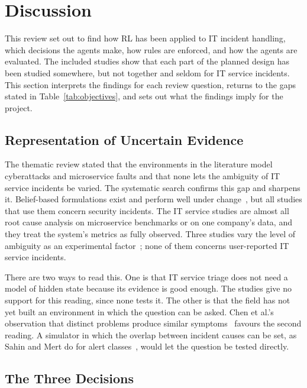 \section{Discussion}
\label{sec:discussion}

This review set out to find how RL has been applied to IT incident handling, which decisions the agents make, how rules are enforced, and how the agents are evaluated. The \NIncluded{} included studies show that each part of the planned design has been studied somewhere, but not together and seldom for IT service incidents. This section interprets the findings for each review question, returns to the gaps stated in Table~\ref{tab:objectives}, and sets out what the findings imply for the project.

\subsection{Representation of Uncertain Evidence}

The thematic review stated that the environments in the literature model cyberattacks and microservice faults and that none lets the ambiguity of IT service incidents be varied. The systematic search confirms this gap and sharpens it. Belief-based formulations exist and perform well under change~\cite{hammar2026belief,hammar2025}, but all \NBelief{} studies that use them concern security incidents. The IT service studies are almost all root cause analysis on microservice benchmarks or on one company's data, and they treat the system's metrics as fully observed. Three studies vary the level of ambiguity as an experimental factor~\cite{contractor2025,sahin2026,wu2026}; none of them concerns user-reported IT service incidents.

There are two ways to read this. One is that IT service triage does not need a model of hidden state because its evidence is good enough. The studies give no support for this reading, since none tests it. The other is that the field has not yet built an environment in which the question can be asked. Chen et al.'s observation that distinct problems produce similar symptoms~\cite{chen2020} favours the second reading. A simulator in which the overlap between incident causes can be set, as Sahin and Mert do for alert classes~\cite{sahin2026}, would let the question be tested directly.

\subsection{The Three Decisions}

